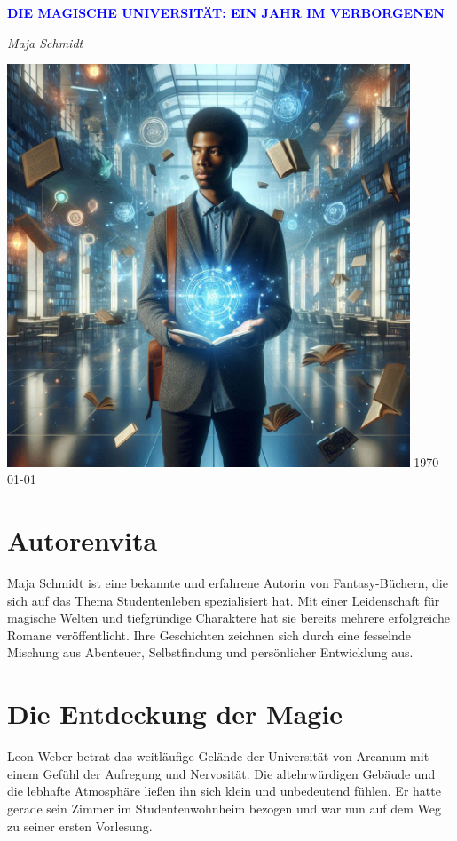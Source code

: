 \documentclass[12pt]{article}
\begin{document}
\begin{titlepage}
    \centering
    \vspace*{3cm}
    {\Huge\bfseries\textcolor{blue}{\MakeUppercase{ Die Magische Universität: Ein Jahr im Verborgenen }}\par}
    \vspace{0.5cm}
    {\Large\textit{ Maja Schmidt }\par}
    \vfill
    \includegraphics[width=0.9\textwidth]{ cover.jpg }
    \vfill
    \today
\end{titlepage}

\section*{Autorenvita}
\vspace{4cm}
Maja Schmidt ist eine bekannte und erfahrene Autorin von Fantasy-Büchern, die sich auf das Thema Studentenleben spezialisiert hat. Mit einer Leidenschaft für magische Welten und tiefgründige Charaktere hat sie bereits mehrere erfolgreiche Romane veröffentlicht. Ihre Geschichten zeichnen sich durch eine fesselnde Mischung aus Abenteuer, Selbstfindung und persönlicher Entwicklung aus.

\clearpage
\tableofcontents
\clearpage


\section{ Die Entdeckung der Magie }
Leon Weber betrat das weitläufige Gelände der Universität von Arcanum mit einem Gefühl der Aufregung und Nervosität. Die altehrwürdigen Gebäude und die lebhafte Atmosphäre ließen ihn sich klein und unbedeutend fühlen. Er hatte gerade sein Zimmer im Studentenwohnheim bezogen und war nun auf dem Weg zu seiner ersten Vorlesung. 
\end{document}
